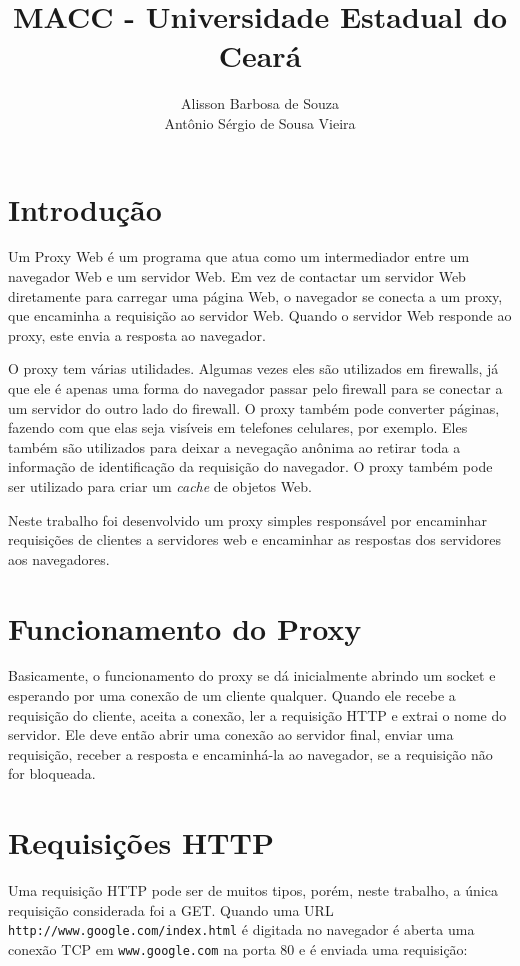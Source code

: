 \documentclass{SBCbookchapter}
\title{MACC - Universidade Estadual do Ceará\\\center{Redes de Computadores - Web Proxy}}
\author{Alisson Barbosa de Souza\\Antônio Sérgio de Sousa Vieira}
\begin{document}
\maketitle


\onehalfspace

\section{Introdução}
Um Proxy Web é um programa que atua como um intermediador entre um navegador Web e um servidor Web. Em vez de contactar um servidor Web diretamente para carregar uma página Web, o navegador se conecta a um proxy, que encaminha a requisição ao servidor Web. Quando o servidor Web responde ao proxy, este envia a resposta ao navegador.

O proxy tem várias utilidades. Algumas vezes eles são utilizados em firewalls, já que ele é apenas uma forma do navegador passar pelo firewall para se conectar a um servidor do outro lado do firewall. O proxy também pode converter páginas, fazendo com que elas seja visíveis em telefones celulares, por exemplo. Eles também são utilizados para deixar a nevegação anônima ao retirar toda a informação de identificação da requisição do navegador. O proxy também pode ser utilizado para criar um \textit{cache} de objetos Web.

Neste trabalho foi desenvolvido um proxy simples responsável por encaminhar requisições de clientes a servidores web e encaminhar as respostas dos servidores aos navegadores.

\section{Funcionamento do Proxy}
Basicamente, o funcionamento do proxy se dá inicialmente abrindo um socket e esperando por uma conexão de um cliente qualquer. Quando ele recebe a requisição do cliente, aceita a conexão, ler a requisição HTTP e extrai o nome do servidor. Ele deve então abrir uma conexão ao servidor final, enviar uma requisição, receber a resposta e encaminhá-la ao navegador, se a requisição não for bloqueada.

\section{Requisições HTTP}
Uma requisição HTTP pode ser de muitos tipos, porém, neste trabalho, a única requisição considerada foi a GET. Quando uma URL {\tt http://www.google.com/index.html} é digitada no navegador é aberta uma conexão TCP em {\tt www.google.com} na porta 80 e é enviada uma requisição:
\end{document}
